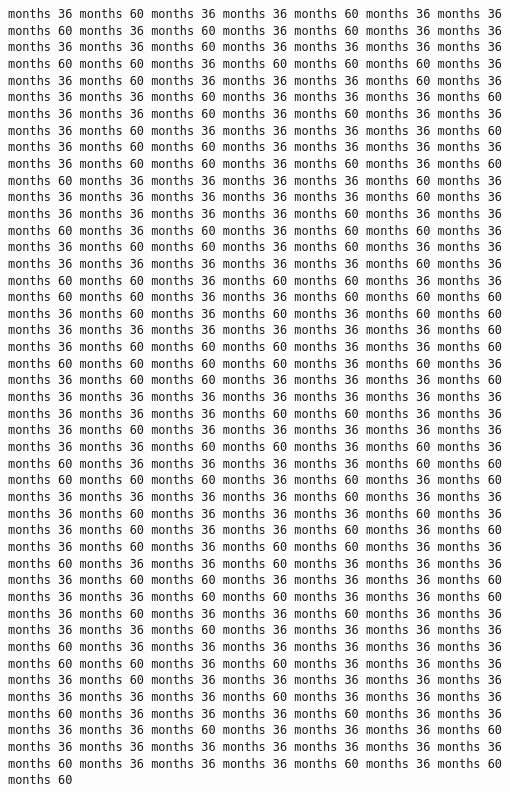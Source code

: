 \documentclass[11pt]{article}
\begin{document}
\begin{Verbatim}[commandchars=\\\{\}, frame=single, framerule=2mm, rulecolor=\color{outerrorbackground}]
months 36 months 60 months 36 months 36 months 60 months 36 months 36 months 60 months 36 months 60 months 36 months 60 months 36 months 36 months 36 months 36 months 60 months 36 months 36 months 36 months 36 months 60 months 60 months 36 months 60 months 60 months 60 months 36 months 36 months 60 months 36 months 36 months 36 months 60 months 36 months 36 months 36 months 60 months 36 months 36 months 36 months 60 months 36 months 36 months 60 months 36 months 60 months 36 months 36 months 36 months 60 months 36 months 36 months 36 months 36 months 60 months 36 months 60 months 60 months 36 months 36 months 36 months 36 months 36 months 60 months 60 months 36 months 60 months 36 months 60 months 60 months 36 months 36 months 36 months 36 months 60 months 36 months 36 months 36 months 36 months 36 months 36 months 60 months 36 months 36 months 36 months 36 months 36 months 60 months 36 months 36 months 60 months 36 months 60 months 36 months 60 months 60 months 36 months 36 months 60 months 60 months 36 months 60 months 36 months 36 months 36 months 36 months 36 months 36 months 36 months 60 months 36 months 60 months 60 months 36 months 60 months 60 months 36 months 36 months 60 months 60 months 36 months 36 months 60 months 60 months 60 months 36 months 60 months 36 months 60 months 36 months 60 months 60 months 36 months 36 months 36 months 36 months 36 months 36 months 60 months 36 months 60 months 60 months 60 months 36 months 36 months 60 months 60 months 60 months 60 months 60 months 36 months 60 months 36 months 36 months 60 months 60 months 36 months 36 months 36 months 60 months 36 months 36 months 36 months 36 months 36 months 36 months 36 months 36 months 36 months 36 months 60 months 60 months 36 months 36 months 36 months 60 months 36 months 36 months 36 months 36 months 36 months 36 months 36 months 60 months 60 months 36 months 60 months 36 months 60 months 36 months 36 months 36 months 36 months 60 months 60 months 60 months 60 months 60 months 36 months 60 months 36 months 60 months 36 months 36 months 36 months 36 months 60 months 36 months 36 months 36 months 60 months 36 months 36 months 36 months 60 months 36 months 36 months 60 months 36 months 36 months 60 months 36 months 60 months 36 months 60 months 36 months 60 months 60 months 36 months 36 months 60 months 36 months 36 months 60 months 36 months 36 months 36 months 36 months 60 months 60 months 36 months 36 months 36 months 60 months 36 months 36 months 60 months 60 months 36 months 36 months 60 months 36 months 60 months 36 months 36 months 60 months 36 months 36 months 36 months 36 months 60 months 36 months 36 months 36 months 36 months 60 months 36 months 36 months 36 months 36 months 36 months 36 months 60 months 60 months 36 months 60 months 36 months 36 months 36 months 36 months 60 months 36 months 36 months 36 months 36 months 36 months 36 months 36 months 36 months 60 months 36 months 36 months 36 months 60 months 36 months 36 months 36 months 60 months 36 months 36 months 36 months 36 months 60 months 36 months 36 months 36 months 60 months 36 months 36 months 36 months 36 months 36 months 36 months 36 months 60 months 36 months 36 months 36 months 60 months 36 months 60 months 60 
\end{Verbatim}
\end{document}
